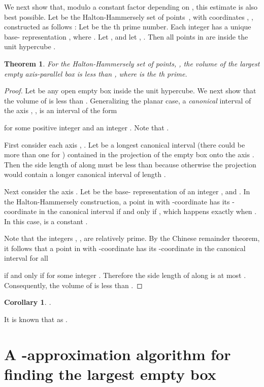 \documentclass[11pt]{article}
\newtheorem{theorem}{Theorem}
\newtheorem{corollary}{Corollary}
\begin{document}
We next show that, modulo a constant factor depending on , this estimate is also best possible. 
Let  be the Halton-Hammersely set of 
points~\cite{Hal60,Ham60}, with coordinates 
, ,
constructed as follows \cite{Ch00,Ma99}:
Let  be the th prime number.
Each integer  has a unique base- representation
, where .
Let ,
and let , .
Then all points in  are inside the unit hypercube .

\begin{theorem} \label{T3}
For the  Halton-Hammersely set of  points, , 
the volume of the largest empty axis-parallel box is less than 
, where  is the th prime.
\end{theorem}
\begin{proof}
Let  be any open empty box inside the unit hypercube.
We next show that the volume of 
is less than .
Generalizing the planar case,
a \emph{canonical} interval of the axis , ,
is an interval of the form

for some positive integer  and an integer .
Note that .

First consider each axis , .
Let 
be a longest canonical interval (there could be more than one for
)
contained in the projection of the empty box  onto the axis .
Then the side length of  along  must be less than
 because otherwise the projection would
contain a longer canonical interval of length .

Next consider the axis .
Let  be the base- representation of
an integer ,  and .
In the Halton-Hammersely construction,
a point in  with -coordinate 
has its -coordinate in the canonical interval  if and only if
,
which happens exactly when
.
In this case, 
is a constant .

Note that the  integers , ,
are relatively prime.
By the Chinese remainder theorem,
it follows that a point in  with -coordinate 
has its -coordinate in the canonical interval  for all

if and only if
 for some integer
.
Therefore the side length of  along 
is at most .
Consequently, the volume of  is less than
.
\end{proof}

\begin{corollary} \label{C2}
.
\end{corollary} 

It is known  that  as  \cite{R97}. 


\section{A -approximation algorithm for finding the largest
empty box}\label{sec:approx1} 
\end{document}
